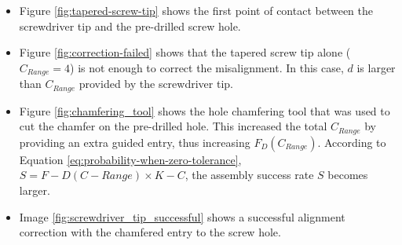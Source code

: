 \begin{itemize}[nosep]
    \item Figure \ref{fig:tapered-screw-tip} shows the first point of contact between the screwdriver tip and the pre-drilled screw hole.
    \item Figure \ref{fig:correction-failed} shows that the tapered screw tip alone ($C_{Range} = 4$) is not enough to correct the misalignment. In this case, $d$ is larger than $C_{Range}$ provided by the screwdriver tip.
    \item Figure \ref{fig:chamfering_tool} shows the hole chamfering tool that was used to cut the chamfer on the pre-drilled hole. This increased the total $C_{Range}$ by providing an extra guided entry, thus increasing $F_D(C_{Range})$. According to Equation \ref{eq:probability-when-zero-tolerance}, $S = F-{D}(C-{Range}) \times K-{C}$, the assembly success rate $S$ becomes larger.
    \item Image \ref{fig:screwdriver_tip_successful} shows a successful alignment correction with the chamfered entry to the screw hole.
\end{itemize}

